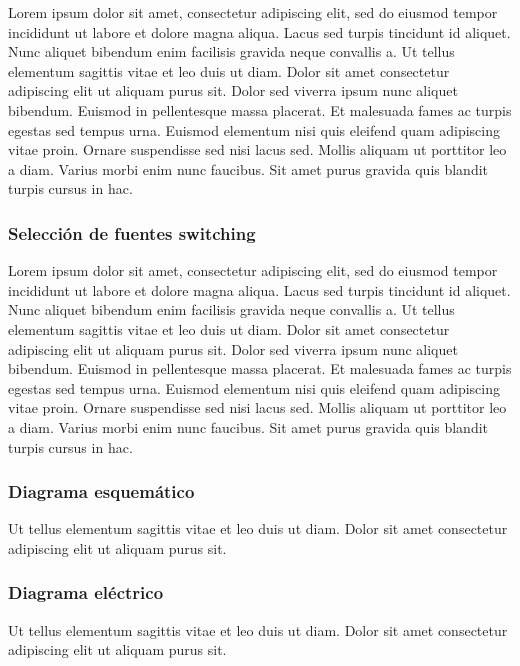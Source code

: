 Lorem ipsum dolor sit amet, consectetur adipiscing elit, sed do eiusmod tempor incididunt ut labore et dolore magna aliqua. Lacus sed turpis tincidunt id aliquet. Nunc aliquet bibendum enim facilisis gravida neque convallis a. Ut tellus elementum sagittis vitae et leo duis ut diam. Dolor sit amet consectetur adipiscing elit ut aliquam purus sit. Dolor sed viverra ipsum nunc aliquet bibendum. Euismod in pellentesque massa placerat. Et malesuada fames ac turpis egestas sed tempus urna. Euismod elementum nisi quis eleifend quam adipiscing vitae proin. Ornare suspendisse sed nisi lacus sed. Mollis aliquam ut porttitor leo a diam. Varius morbi enim nunc faucibus. Sit amet purus gravida quis blandit turpis cursus in hac.

\subsubsection{Selección de fuentes switching}

Lorem ipsum dolor sit amet, consectetur adipiscing elit, sed do eiusmod tempor incididunt ut labore et dolore magna aliqua. Lacus sed turpis tincidunt id aliquet. Nunc aliquet bibendum enim facilisis gravida neque convallis a. Ut tellus elementum sagittis vitae et leo duis ut diam. Dolor sit amet consectetur adipiscing elit ut aliquam purus sit. Dolor sed viverra ipsum nunc aliquet bibendum. Euismod in pellentesque massa placerat. Et malesuada fames ac turpis egestas sed tempus urna. Euismod elementum nisi quis eleifend quam adipiscing vitae proin. Ornare suspendisse sed nisi lacus sed. Mollis aliquam ut porttitor leo a diam. Varius morbi enim nunc faucibus. Sit amet purus gravida quis blandit turpis cursus in hac.


\subsubsection{Diagrama esquemático} 

Ut tellus elementum sagittis vitae et leo duis ut diam. Dolor sit amet consectetur adipiscing elit ut aliquam purus sit.


\subsubsection{Diagrama eléctrico} 

Ut tellus elementum sagittis vitae et leo duis ut diam. Dolor sit amet consectetur adipiscing elit ut aliquam purus sit.

